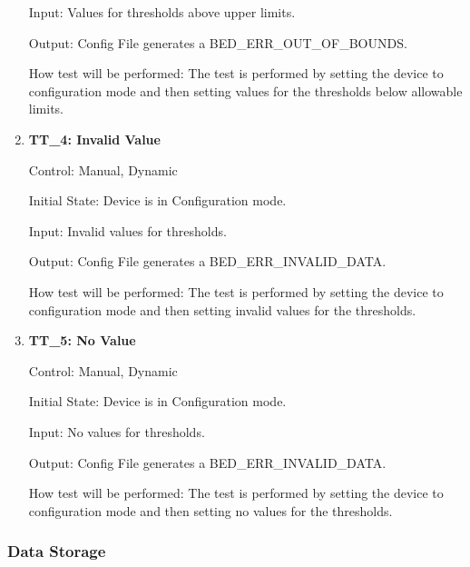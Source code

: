 \documentclass[12pt, titlepage]{article}
\begin{document}
\begin{enumerate}
		Input: Values for thresholds above upper limits.
		
		Output: Config File generates a BED\_ERR\_OUT\_OF\_BOUNDS.
		
		How test will be performed: The test is performed by setting the device to configuration mode and then setting values for the thresholds below allowable limits.
\newpage
	\item{\textbf{TT\_4: Invalid Value} \\}\label{TT4}
	
		Control: Manual, Dynamic
							
		Initial State: Device is in Configuration mode.
							
		Input: Invalid values for thresholds.
		
		Output: Config File generates a BED\_ERR\_INVALID\_DATA.
		
		How test will be performed: The test is performed by setting the device to configuration mode and then setting invalid values for the thresholds.

	\item{\textbf{TT\_5: No Value} \\}\label{TT5}
	
		Control: Manual, Dynamic
							
		Initial State: Device is in Configuration mode.
							
		Input: No values for thresholds.
		
		Output: Config File generates a BED\_ERR\_INVALID\_DATA.

		How test will be performed: The test is performed by setting the device to configuration mode and then setting no values for the thresholds.
\end{enumerate}

\subsubsection{Data Storage}
\end{document}
